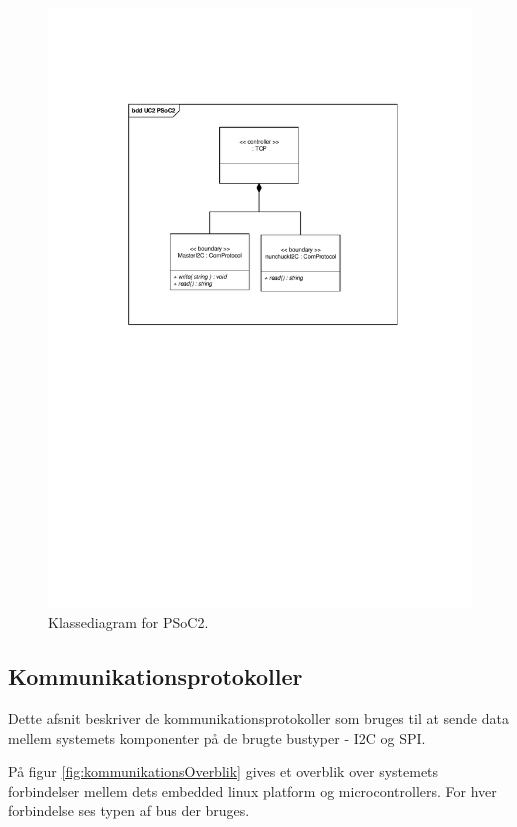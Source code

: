 \begin{figure}[H]
	\centering
	\includegraphics[trim = {3.8cm 13.8cm 3.3cm 4.5cm}, clip = true, width=\textwidth] {Systemarkitektur/images/klassediagramPSoC2.pdf}
	\caption{Klassediagram for PSoC2.}
	\label{fig:klassePSoC2}
\end{figure}

\subsection{Kommunikationsprotokoller}

Dette afsnit beskriver de kommunikationsprotokoller som bruges til at sende data mellem systemets komponenter på de brugte bustyper - I2C og SPI.

På figur \ref{fig:kommunikationsOverblik} gives et overblik over systemets forbindelser mellem dets embedded linux platform og microcontrollers. For hver forbindelse ses typen af bus der bruges.

